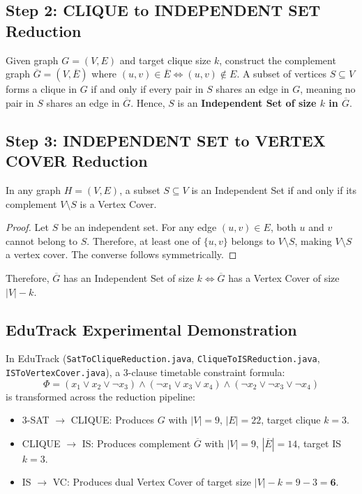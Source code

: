 \subsection{Step 2: CLIQUE to INDEPENDENT SET Reduction}
Given graph $G = (V, E)$ and target clique size $k$, construct the complement graph $\overline{G} = (V, \overline{E})$ where $(u, v) \in \overline{E} \iff (u, v) \notin E$.
A subset of vertices $S \subseteq V$ forms a clique in $G$ if and only if every pair in $S$ shares an edge in $G$, meaning no pair in $S$ shares an edge in $\overline{G}$. Hence, $S$ is an \textbf{Independent Set of size $k$ in $\overline{G}$}.

\subsection{Step 3: INDEPENDENT SET to VERTEX COVER Reduction}
\begin{theorem}
In any graph $H = (V, E)$, a subset $S \subseteq V$ is an Independent Set if and only if its complement $V \setminus S$ is a Vertex Cover.
\end{theorem}
\begin{proof}
Let $S$ be an independent set. For any edge $(u, v) \in E$, both $u$ and $v$ cannot belong to $S$. Therefore, at least one of $\{u, v\}$ belongs to $V \setminus S$, making $V \setminus S$ a vertex cover. The converse follows symmetrically.
\end{proof}
Therefore, $\overline{G}$ has an Independent Set of size $k \iff \overline{G}$ has a Vertex Cover of size $|V| - k$.

\subsection{EduTrack Experimental Demonstration}
In EduTrack (\texttt{SatToCliqueReduction.java}, \texttt{CliqueToISReduction.java}, \texttt{ISToVertexCover.java}), a 3-clause timetable constraint formula:
\begin{equation}
\Phi = (x_1 \lor x_2 \lor \neg x_3) \land (\neg x_1 \lor x_3 \lor x_4) \land (\neg x_2 \lor \neg x_3 \lor \neg x_4)
\end{equation}
is transformed across the reduction pipeline:
\begin{itemize}
    \item 3-SAT $\to$ CLIQUE: Produces $G$ with $|V| = 9$, $|E| = 22$, target clique $k = 3$.
    \item CLIQUE $\to$ IS: Produces complement $\overline{G}$ with $|V| = 9$, $|\overline{E}| = 14$, target IS $k = 3$.
    \item IS $\to$ VC: Produces dual Vertex Cover of target size $|V| - k = 9 - 3 = \mathbf{6}$.
\end{itemize}

